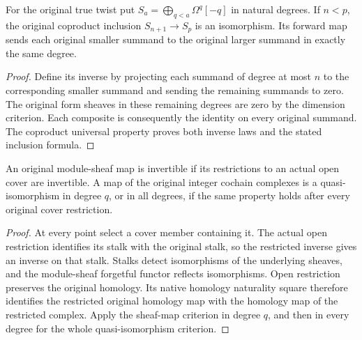 \begin{lemma}
\label{lem:di-reused-native-dimension-source}
\leanok
{}
For the original true twist put
$S_a=\bigoplus_{q<a}\Omega^q[-q]$ in natural degrees. If $n<p$, the
original coproduct inclusion $S_{n+1}\to S_p$ is an isomorphism. Its
forward map sends each original smaller summand to the original larger
summand in exactly the same degree.
\end{lemma}
\begin{proof}
\leanok
Define its inverse by projecting each summand of degree at most $n$
to the corresponding smaller summand and sending the remaining
summands to zero. The original form sheaves in these remaining degrees
are zero by the dimension criterion. Each composite is consequently
the identity on every original summand. The coproduct universal
property proves both inverse laws and the stated inclusion formula.
\end{proof}

\begin{lemma}
\label{lem:di-reused-native-cover-detection}
\leanok
An original module-sheaf map is invertible if its restrictions to an
actual open cover are invertible. A map of the original integer
cochain complexes is a quasi-isomorphism in degree $q$, or in all
degrees, if the same property holds after every original cover
restriction.
\end{lemma}
\begin{proof}
\leanok
At every point select a cover member containing it. The actual open
restriction identifies its stalk with the original stalk, so the
restricted inverse gives an inverse on that stalk. Stalks detect
isomorphisms of the underlying sheaves, and the module-sheaf forgetful
functor reflects isomorphisms. Open restriction preserves the original
homology. Its native homology naturality square therefore identifies
the restricted original homology map with the homology map of the
restricted complex. Apply the sheaf-map criterion in degree $q$, and
then in every degree for the whole quasi-isomorphism criterion.
\end{proof}
